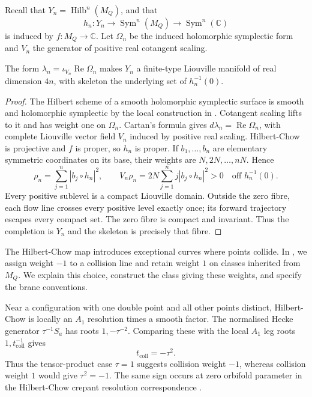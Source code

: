 \documentclass[a4paper]{amsart}
\newcommand{\C}{\mathbb{C}}
\DeclareMathOperator{\Ree}{Re}
\numberwithin{equation}{section}
\begin{document}
Recall that $Y_n=\operatorname{Hilb}^n(M_Q)$, and that
\[
 h_n:Y_n\longrightarrow\operatorname{Sym}^n(M_Q)
       \longrightarrow\operatorname{Sym}^n(\C)
\]
is induced by $f:M_Q\to\C$. Let $\Omega_n$ be the induced
holomorphic symplectic form and $V_n$ the generator of positive
real cotangent scaling.

\begin{proposition}\label{prop:hilbert-liouville}
The form $\lambda_n=\iota_{V_n}\Ree\Omega_n$ makes $Y_n$ a
finite-type Liouville manifold of real dimension $4n$, with
skeleton the underlying set of $h_n^{-1}(0)$.
\end{proposition}
\begin{proof}
The Hilbert scheme of a smooth holomorphic symplectic surface
is smooth and holomorphic symplectic by the local construction in
\cite[Section~6, Proposition~5]{BeauvilleHilbert}. Cotangent scaling lifts
to it and has weight one on $\Omega_n$. Cartan's formula gives
$d\lambda_n=\Ree\Omega_n$, with complete Liouville vector field
$V_n$ induced by positive real scaling.
Hilbert-Chow is projective and $f$ is proper, so $h_n$ is
proper. If $b_1,\ldots,b_n$ are elementary symmetric coordinates
on its base, their weights are $N,2N,\ldots,nN$. Hence
\[
 \rho_n=\sum_{j=1}^n|b_j\circ h_n|^2,\qquad
 V_n\rho_n=2N\sum_{j=1}^nj|b_j\circ h_n|^2>0
       \quad\text{off }h_n^{-1}(0).
\]
Every positive sublevel is a compact Liouville domain. Outside
the zero fibre, each flow line crosses every positive level
exactly once; its forward trajectory escapes every compact set.
The zero fibre is compact and invariant. Thus the completion is
$Y_n$ and the skeleton is precisely that fibre.
\end{proof}

The Hilbert-Chow map introduces exceptional curves where points
collide. In , we assign weight $-1$ to a
collision line and retain weight $1$ on classes inherited from
$M_Q$. We explain this choice, construct the class giving these
weights, and specify the brane conventions.

Near a configuration with one double point and all other points
distinct, Hilbert-Chow is locally an $A_1$ resolution times a smooth
factor. The normalised Hecke generator $\tau^{-1}S_a$ has roots
$1,-\tau^{-2}$. Comparing these with the local $A_1$ leg roots
$1,t_{\mathrm{coll}}^{-1}$ gives
\[
 t_{\mathrm{coll}}=-\tau^2.
\]
Thus the tensor-product case $\tau=1$ suggests collision weight
$-1$, whereas collision weight $1$ would give $\tau^2=-1$.
The same sign occurs at zero orbifold parameter in the
Hilbert-Chow crepant resolution correspondence
\cite[Theorem~3.11]{BryanGraber}.
\end{document}
